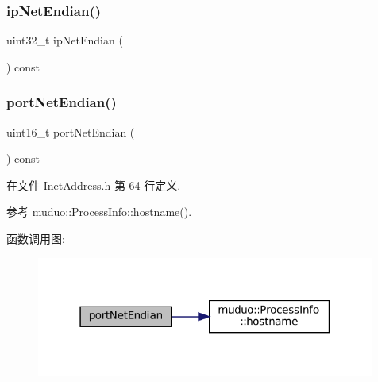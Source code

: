 \subsubsection{\texorpdfstring{ip\+Net\+Endian()}{ipNetEndian()}}
{\footnotesize\ttfamily uint32\+\_\+t ip\+Net\+Endian (\begin{DoxyParamCaption}{ }\end{DoxyParamCaption}) const}

\mbox{\label{classmuduo_1_1net_1_1InetAddress_aa95202a1992cdd3177c9f76b4f9fc63e}} 
\subsubsection{\texorpdfstring{port\+Net\+Endian()}{portNetEndian()}}
{\footnotesize\ttfamily uint16\+\_\+t port\+Net\+Endian (\begin{DoxyParamCaption}{ }\end{DoxyParamCaption}) const\hspace{0.3cm}{\ttfamily [inline]}}



在文件 Inet\+Address.\+h 第 64 行定义.



参考 muduo\+::\+Process\+Info\+::hostname().

函数调用图\+:
\nopagebreak
\begin{figure}[H]
\begin{center}
\leavevmode
\includegraphics[width=315pt]{classmuduo_1_1net_1_1InetAddress_aa95202a1992cdd3177c9f76b4f9fc63e_cgraph}
\end{center}
\end{figure}
\mbox{\label{classmuduo_1_1net_1_1InetAddress_a5d40420d8fdfc726444cfc5a5d2c1cad}} 
